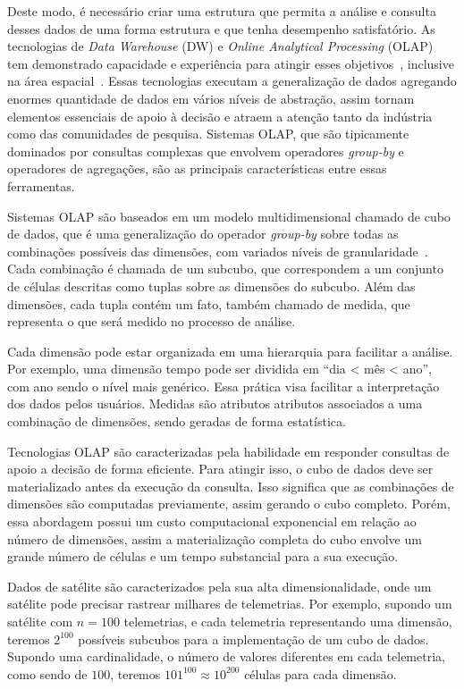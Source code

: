 Deste modo, é necessário criar uma estrutura que permita a análise e consulta desses dados de uma forma estrutura e que tenha desempenho satisfatório.
As tecnologias de \textit{Data Warehouse} (DW) e \textit{Online Analytical Processing} (OLAP) tem demonstrado capacidade e experiência para atingir esses objetivos~\cite{bimonteOpenIssuesBig2016}, inclusive na área espacial~\cite{yvernesCopernicusGroundSegment2018}.
Essas tecnologias executam a generalização de dados agregando enormes quantidade de dados em vários níveis de abstração, assim tornam elementos essenciais de apoio à decisão e atraem a atenção tanto da indústria como das comunidades de pesquisa.
Sistemas OLAP, que são tipicamente dominados por consultas complexas que envolvem operadores \textit{group-by} e operadores de agregações, são as principais características entre essas ferramentas.

Sistemas OLAP são baseados em um modelo multidimensional chamado de cubo de dados, que é uma generalização do operador \textit{group-by} sobre todas as combinações possíveis das dimensões, com variados níveis de granularidade~\cite{grayDataCubeRelational1996}.
Cada combinação é chamada de um subcubo, que correspondem a um conjunto de células descritas como tuplas sobre as dimensões do subcubo.
Além das dimensões, cada tupla contém um fato, também chamado de medida, que representa o que será medido no processo de análise.

Cada dimensão pode estar organizada em uma hierarquia para facilitar a análise.
Por exemplo, uma dimensão tempo pode ser dividida em ``dia < mês < ano'', com ano sendo o nível mais genérico.
Essa prática visa facilitar a interpretação dos dados pelos usuários.
Medidas são atributos atributos associados a uma combinação de dimensões, sendo geradas de forma estatística.

Tecnologias OLAP são caracterizadas pela habilidade em responder consultas de apoio a decisão de forma eficiente.
Para atingir isso, o cubo de dados deve ser materializado antes da execução da consulta.
Isso significa que as combinações de dimensões são computadas previamente, assim gerando o cubo completo.
Porém, essa abordagem possui um custo computacional exponencial em relação ao número de dimensões, assim a materialização completa do cubo envolve um grande número de células e um tempo substancial para a sua execução.

Dados de satélite são caracterizados pela sua alta dimensionalidade, onde um satélite pode precisar rastrear milhares de telemetrias.
Por exemplo, supondo um satélite com $n = 100$ telemetrias, e cada telemetria representando uma dimensão, teremos $2^{100}$ possíveis subcubos para a implementação de um cubo de dados.
Supondo uma cardinalidade, o número de valores diferentes em cada telemetria, como sendo de $100$, teremos $101^{100} \approx 10^{200}$ células para cada dimensão.

